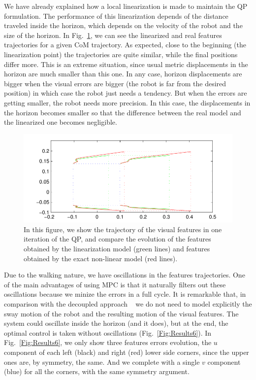 We have already explained how a local linearization is made to maintain the QP formulation. The performance of this linearization depends of the distance traveled inside the horizon, which depends on the velocity of the robot and the size of the horizon. In Fig.~\ref{Fig:Results5}, we can see the linearized and real features trajectories for a given CoM trajectory. As expected, close to the beginning (the linearization point) the trajectories are quite similar, while the final positions differ more. This is an extreme situation, since usual metric displacements in the horizon are much smaller than this one. In any case, horizon displacements are bigger when the visual errors are bigger (the robot is far from the desired position) in which case the robot just needs a tendency. But when the errors are getting smaller, the robot needs more precision. In this case, the displacements in the horizon becomes smaller so that the difference between the real model and the linearized one becomes negligible.

\begin{figure}[h]
 \centering
 \includegraphics[scale=.6]{Chap4-Visual-Servoing/comparison_linearization}
 \caption{\label{Fig:Results5}\small{In this figure, we show the trajectory of the visual features in one iteration of the QP, and compare the evolution of the features obtained by the linearization model (green lines) and features obtained by the exact non-linear model (red lines).}}
 \end{figure}

Due to the walking nature, we have oscillations in the features trajectories. One of the main advantages of using MPC is that it naturally filters out these oscillations because we minize the errors in a full cycle. It is remarkable that, in comparison with the decoupled approach ~\cite{DuneIROS2010} we do not need to model explicitly the sway motion of the robot and the resulting motion of the visual features. The system could oscillate inside the horizon (and it does), but at the end, the optimal control is taken without oscillations (Fig.~\ref{Fig:Results6}). In Fig.~\ref{Fig:Results6}, we only show three features errors evolution, the $u$ component of each left (black) and right (red) lower side corners, since the upper ones are, by symmetry, the same. And we complete with a single $v$ component (blue) for all the corners, with the same symmetry argument. 

